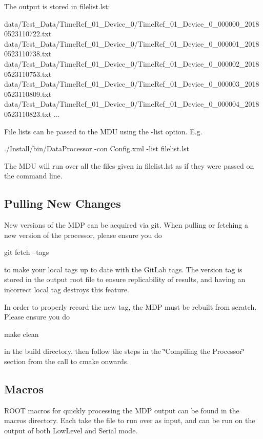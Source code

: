 The output is stored in {\ttfamily filelist.\+lst}\+: 
\begin{DoxyCode}
data/Test\_Data/TimeRef\_01\_Device\_0/TimeRef\_01\_Device\_0\_000000\_20180523110722.txt
data/Test\_Data/TimeRef\_01\_Device\_0/TimeRef\_01\_Device\_0\_000001\_20180523110738.txt
data/Test\_Data/TimeRef\_01\_Device\_0/TimeRef\_01\_Device\_0\_000002\_20180523110753.txt
data/Test\_Data/TimeRef\_01\_Device\_0/TimeRef\_01\_Device\_0\_000003\_20180523110809.txt
data/Test\_Data/TimeRef\_01\_Device\_0/TimeRef\_01\_Device\_0\_000004\_20180523110823.txt
...
\end{DoxyCode}


File lists can be passed to the M\+DU using the {\ttfamily -\/list} option. E.\+g. 
\begin{DoxyCode}
./Install/bin/DataProcessor -con Config.xml -list filelist.lst
\end{DoxyCode}


The M\+DU will run over all the files given in {\ttfamily filelist.\+lst} as if they were passed on the command line.

\subsection*{Pulling New Changes \label{_Pulling}%
}

New versions of the M\+DP can be acquired via git. When pulling or fetching a new version of the processor, please ensure you do 
\begin{DoxyCode}
git fetch --tags
\end{DoxyCode}
 to make your local tags up to date with the Git\+Lab tags. The version tag is stored in the output root file to ensure replicability of results, and having an incorrect local tag destroys this feature.

In order to properly record the new tag, the M\+DP must be rebuilt from scratch. Please ensure you do 
\begin{DoxyCode}
make clean
\end{DoxyCode}
 in the build directory, then follow the steps in the \char`\"{}\+Compiling the Processor\char`\"{} section from the call to {\ttfamily cmake} onwards.

\subsection*{Macros \label{_Macros}%
}

R\+O\+OT macros for quickly processing the M\+DP output can be found in the {\ttfamily macros} directory. Each take the file to run over as input, and can be run on the output of both {\ttfamily Low\+Level} and {\ttfamily Serial} mode.

